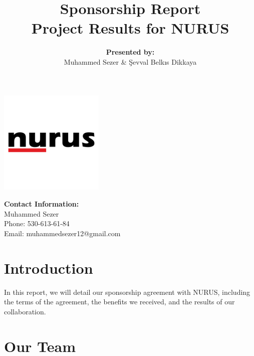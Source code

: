 \documentclass{article}
\title{\Huge\textbf{Sponsorship Report}\\[1cm]\LARGE Project Results for NURUS}
\author{\Large\textbf{Presented by:}\\[0.5cm] Muhammed Sezer \& Şevval Belkıs Dikkaya}
\newcommand{\logo}{\includegraphics[width=5cm]{nurus_logo.png}}
\begin{document}
\begin{titlepage}
    \centering
    
    \logo
    
    \vspace{1cm}
    
    \maketitle
    
    \vfill
    
    \textbf{Contact Information:}\\[0.2cm]
    Muhammed Sezer\\
    Phone: 530-613-61-84\\
    Email: muhammedsezer12@gmail.com
\end{titlepage}

\section{Introduction}

In this report, we will detail our sponsorship agreement with NURUS, including the terms of the agreement, the benefits we received, and the results of our collaboration.
\section{Our Team}

\FloatBarrier
\end{document}
